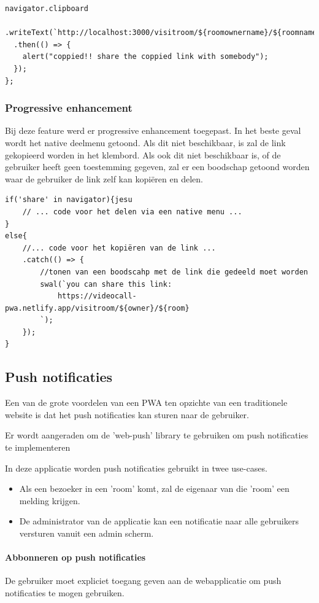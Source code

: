 \begin{lstlisting}
navigator.clipboard
  .writeText(`http://localhost:3000/visitroom/${roomownername}/${roomname}`)
  .then(() => {
    alert("coppied!! share the coppied link with somebody");
  });
};
\end{lstlisting}

		\subsubsection{Progressive enhancement}

			Bij deze feature werd er progressive enhancement toegepast. 
			In het beste geval wordt het native deelmenu getoond. Als dit niet beschikbaar, is zal de link gekopieerd worden in het klembord.
			Als ook dit niet beschikbaar is, of de gebruiker heeft geen toestemming gegeven, zal er een boodschap getoond worden waar de gebruiker de link zelf kan kopiëren en delen.
		
\begin{lstlisting}
if('share' in navigator){jesu
	// ... code voor het delen via een native menu ...
}
else{
	//... code voor het kopiëren van de link ...
	.catch(() => {
		//tonen van een boodscahp met de link die gedeeld moet worden
		swal(`you can share this link:
			https://videocall-pwa.netlify.app/visitroom/${owner}/${room}
		`);
	});
}
\end{lstlisting}


	\subsection{Push notificaties}
	
		Een van de grote voordelen van een PWA ten opzichte van een traditionele website is dat het push notificaties kan sturen naar de gebruiker.
		
		Er wordt aangeraden om de 'web-push' library te gebruiken om push notificaties te implementeren
		
		In deze applicatie worden push notificaties gebruikt in twee use-cases. 
		\begin{itemize}
			\item 	Als een bezoeker in een 'room' komt, zal de eigenaar van die 'room' een melding krijgen.
			\item 	De administrator van de applicatie kan een notificatie naar alle gebruikers versturen vanuit een admin scherm.
		\end{itemize}	
		
		\paragraph{Abbonneren op push notificaties}
			 De gebruiker moet expliciet toegang geven aan de webapplicatie om push notificaties te mogen gebruiken.
			 
